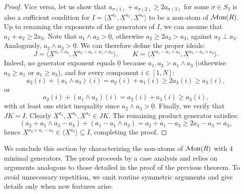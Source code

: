 \documentclass[a4paper,10pt,reqno]{amsart}
\theoremstyle{definition}
\theoremstyle{definition}
\providecommand\Mon{{\mathcal{M}{\rm on}}}
\begin{document}
\begin{proof}
Vice versa, let us show that $a_{\sigma(1)}+a_{\sigma(2)}\ge 2a_{\sigma(3)}$ for some $\sigma\in S_3$ is also a sufficient condition for $I=\langle \underline X^{a_1}, \underline X^{a_2}, \underline X^{a_3} \rangle$ to be a non-atom of $\Mon(R)$. Up to renaming the exponents of the generators of $I$, we can assume that $a_1+a_2\ge 2a_3$. Note that $a_1\wedge a_3>\underline 0$, otherwise $a_2\ge 2a_3 > a_3$, against $a_2\perp a_3$. Analogously, $a_2\wedge a_3>\underline 0$. We can therefore define the proper ideals:
\[
    J = \langle \underline{X}^{a_1 \wedge a_3}, \underline{X}^{a_2-a_3+a_1 \wedge a_3} \rangle, \qquad
    K = \langle \underline{X}^{a_1 - a_1 \wedge a_3}, \underline{X}^{a_3 - a_1 \wedge a_3} \rangle.
\]
Indeed, no generator exponent equals $\underline{0}$ because $a_1, a_3 > a_1 \wedge a_3$ (otherwise $a_3\ge a_1$ or $a_1\ge a_3$), and for every component $i \in [1,N]$:
\[
    a_2(i) + (a_1 \wedge a_3)(i) = a_2(i)+a_1(i)\ge 2a_3(i) \ge a_3(i),
\]
or
\[
    a_2(i) + (a_1 \wedge a_3)(i) = a_2(i)+a_3(i) \ge a_3(i),
\]
with at least one strict inequality since $a_2 \wedge a_3 > \underline{0}$. Finally, we verify that $JK = I$. Clearly $\underline{X}^{a_1}, \underline{X}^{a_2}, \underline{X}^{a_3} \in JK$. The remaining product generator satisfies:
\[
    (a_2 + a_1 \wedge a_3 - a_3) + (a_1 - a_1 \wedge a_3) = a_2 + a_1 - a_3 \ge 2a_3 - a_3 = a_3,
\]
hence $\underline{X}^{a_2+a_1-a_3} \in \langle \underline{X}^{a_3} \rangle \subseteq I$, completing the proof.
\end{proof}

We conclude this section by characterizing the non-atoms of $\Mon(R)$ with $4$ minimal generators. The proof proceeds by a case analysis and relies on arguments analogous to those detailed in the proof of the previous theorem. To avoid unnecessary repetition, we omit routine symmetric arguments and give details only when new features arise.
\end{document}
